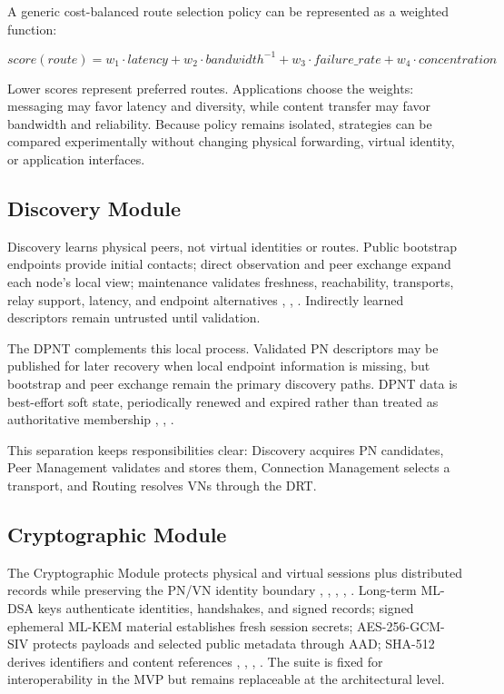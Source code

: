 \documentclass[
  12pt,
  oneside,
  a4paper,
  chapter=TITLE,
  section=TITLE,
  english,
  brazil
]{abntex2}
\begin{document}
A generic cost-balanced route selection policy can be represented as a weighted
function:

\[
score(route) =
w_1 \cdot latency +
w_2 \cdot bandwidth^{-1} +
w_3 \cdot failure\_rate +
w_4 \cdot concentration
\]

Lower scores represent preferred routes. Applications choose the weights: messaging may favor latency and diversity, while content transfer may favor bandwidth and reliability. Because policy remains isolated, strategies can be compared experimentally without changing physical forwarding, virtual identity, or application interfaces.






\subsection{Discovery Module}


\thesispeerdiscoverytikz


Discovery learns physical peers, not virtual identities or routes. Public bootstrap endpoints provide initial contacts; direct observation and peer exchange expand each node's local view; maintenance validates freshness, reachability, transports, relay support, latency, and endpoint alternatives \cite{li2022unreachable}, \cite{augustine2022byzantine}, \cite{qian2016garlic}. Indirectly learned descriptors remain untrusted until validation.

The DPNT complements this local process. Validated PN descriptors may be published for later recovery when local endpoint information is missing, but bootstrap and peer exchange remain the primary discovery paths. DPNT data is best-effort soft state, periodically renewed and expired rather than treated as authoritative membership \cite{li2022unreachable}, \cite{augustine2022byzantine}, \cite{qian2016garlic}.

This separation keeps responsibilities clear: Discovery acquires PN candidates, Peer Management validates and stores them, Connection Management selects a transport, and Routing resolves VNs through the DRT.




\subsection{Cryptographic Module}

The Cryptographic Module protects physical and virtual sessions plus distributed records while preserving the PN/VN identity boundary \cite{li2022unreachable}, \cite{mirzaei2018pk}, \cite{qian2016garlic}, \cite{bos2017kyber}, \cite{nist2024fips203}. Long-term ML-DSA keys authenticate identities, handshakes, and signed records; signed ephemeral ML-KEM material establishes fresh session secrets; AES-256-GCM-SIV protects payloads and selected public metadata through AAD; SHA-512 derives identifiers and content references \cite{bos2017kyber}, \cite{nist2024fips203}, \cite{nist2024fips204}, \cite{rfc8452}. The suite is fixed for interoperability in the MVP but remains replaceable at the architectural level.
\end{document}
